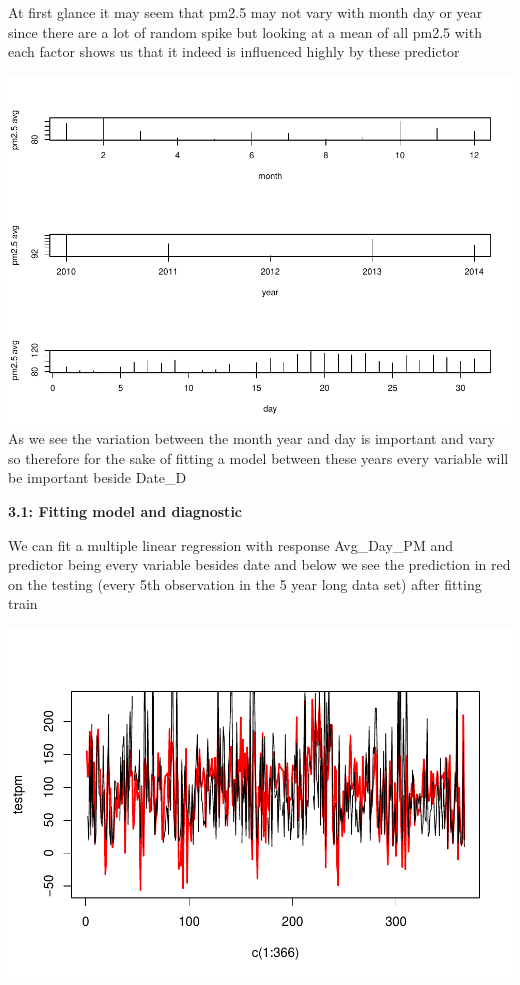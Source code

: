 \documentclass[
]{article}
\begin{document}
At first glance it may seem that pm2.5 may not vary with month day or
year since there are a lot of random spike but looking at a mean of all
pm2.5 with each factor shows us that it indeed is influenced highly by
these predictor

\includegraphics{Final_Project_2_files/figure-latex/unnamed-chunk-6-1.pdf}
As we see the variation between the month year and day is important and
vary so therefore for the sake of fitting a model between these years
every variable will be important beside Date\_D

\textbf{3.1: Fitting model and diagnostic}

We can fit a multiple linear regression with response Avg\_Day\_PM and
predictor being every variable besides date and below we see the
prediction in red on the testing (every 5th observation in the 5 year
long data set) after fitting train

\includegraphics{Final_Project_2_files/figure-latex/unnamed-chunk-7-1.pdf}
\end{document}
